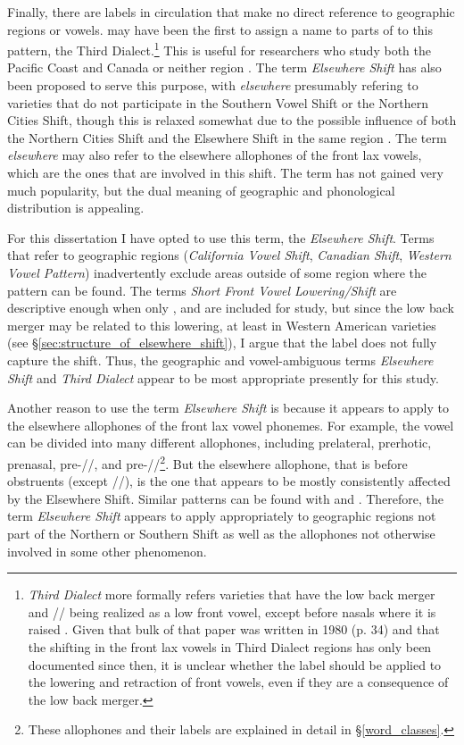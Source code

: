 Finally, there are labels in circulation that make no direct reference to geographic regions or vowels. \citet{labov_1991} may have been the first to assign a name to parts of to this pattern, the Third Dialect.\footnote{\textit{Third Dialect} more formally refers varieties that have the low back merger and /\textipa{\ae}/ being realized as a low front vowel, except before nasals where it is raised \citep[30]{labov_1991}. Given that bulk of that paper was written in 1980 (p. 34) and that the shifting in the front lax vowels in Third Dialect regions has only been documented since then, it is unclear whether the label should be applied to the lowering and retraction of front vowels, even if they are a consequence of the low back merger.} This is useful for researchers who study both the Pacific Coast and Canada \citep{swan_2018} or neither region \citep{durian_2012_diss}. The term \textit{Elsewhere Shift} has also been proposed to serve this purpose, with \textit{elsewhere} presumably refering to varieties that do not participate in the Southern Vowel Shift or the Northern Cities Shift, though this is relaxed somewhat due to the possible influence of both the Northern Cities Shift and the Elsewhere Shift in the same region \citep{mason_2018}. The term \textit{elsewhere} may also refer to the elsewhere allophones of the front lax vowels, which are the ones that are involved in this shift. The term has not gained very much popularity, but the dual meaning of geographic and phonological distribution is appealing.

For this dissertation I have opted to use this term, the \textit{Elsewhere Shift}. Terms that refer to geographic regions (\textit{California Vowel Shift}, \textit{Canadian Shift}, \textit{Western Vowel Pattern}) inadvertently exclude areas outside of some region where the pattern can be found. The terms \textit{Short Front Vowel Lowering/Shift} are descriptive enough when only \kit, \dress and \trap are included for study, but since the low back merger may be related to this lowering, at least in Western American varieties (see \S\ref{sec:structure_of_elsewhere_shift}), I argue that the label does not fully capture the shift. Thus, the geographic and vowel-ambiguous terms \textit{Elsewhere Shift} and \textit{Third Dialect} appear to be most appropriate presently for this study.

Another reason to use the term \textit{Elsewhere Shift} is because it appears to apply to the elsewhere allophones of the front lax vowel phonemes. For example, the \trap vowel can be divided into many different allophones, including prelateral, prerhotic, prenasal, pre-//, and pre-//\footnote{These allophones and their labels are explained in detail in \S\ref{word_classes}.}. But the elsewhere allophone, that is \trap before obstruents (except //), is the one that appears to be mostly consistently affected by the Elsewhere Shift. Similar patterns can be found with \dress and \kit. Therefore, the term \textit{Elsewhere Shift} appears to apply appropriately to geographic regions not part of the Northern or Southern Shift as well as the allophones not otherwise involved in some other phenomenon.

